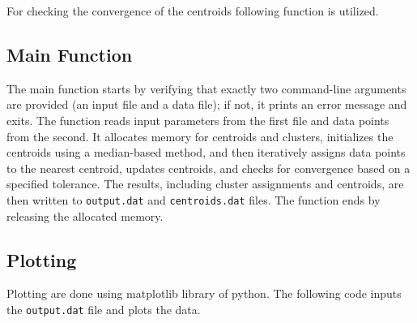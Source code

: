 For checking the convergence of the centroids following function is utilized.


\subsection{Main Function}
The main function starts by verifying that exactly two command-line arguments are provided (an input file and a data file); if not, it prints an error message and exits. The function reads input parameters from the first file and data points from the second. It allocates memory for centroids and clusters, initializes the centroids using a median-based method, and then iteratively assigns data points to the nearest centroid, updates centroids, and checks for convergence based on a specified tolerance. The results, including cluster assignments and centroids, are then written to \texttt{output.dat} and \texttt{centroids.dat} files. The function ends by releasing the allocated memory.


\subsection{Plotting}
Plotting are done using matplotlib library of python. The following code inputs the \texttt{output.dat} file and plots the data.

